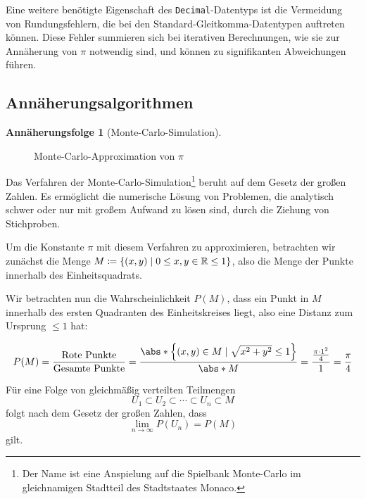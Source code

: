 \documentclass{scrartcl}
\theoremstyle{definition}
\newtheorem{approximation sequence}{Annäherungsfolge}
\DeclarePairedDelimiter{\set}{\lbrace}{\rbrace}
\DeclarePairedDelimiter{\tuple}{\lparen}{\rparen}
\newcommand{\field}[1]{\mathbb{#1}}
\newcommand{\reals}{\field{R}}
\begin{document}
Eine weitere benötigte Eigenschaft des \texttt{Decimal}-Datentyps ist die
Vermeidung von Rundungsfehlern, die bei den Standard-Gleitkomma-Datentypen
auftreten können. Diese Fehler summieren sich bei iterativen Berechnungen, wie
sie zur Annäherung von \(\pi\) notwendig sind, und können zu signifikanten
Abweichungen führen.

\subsection{Annäherungsalgorithmen}

\begin{approximation sequence}[Monte-Carlo-Simulation]~\\[12pt]
\begin{figure}[H]
    \centering
    
    \caption{Monte-Carlo-Approximation von \(\pi\)}
    \label{fig:monte-carlo-approximation}
\end{figure}

Das Verfahren der Monte-Carlo-Simulation\footnote{Der Name ist eine Anspielung
auf die Spielbank Monte-Carlo im gleichnamigen Stadtteil des Stadtstaates
Monaco.\cite{anderson:1986:metropolis}} beruht auf dem Gesetz der großen
Zahlen. Es ermöglicht die numerische Lösung von Problemen, die analytisch
schwer oder nur mit großem Aufwand zu lösen sind, durch die Ziehung von
Stichproben.

Um die Konstante \(\pi\) mit diesem Verfahren zu approximieren, betrachten wir
zunächst die Menge \(M \coloneq \set{\tuple{x, y} \mid 0 \le x,y \in \reals \le
1 }\), also die Menge der Punkte innerhalb des Einheitsquadrats.

Wir betrachten nun die Wahrscheinlichkeit \(P(M)\), dass ein Punkt in \(M\)
innerhalb des ersten Quadranten des Einheitskreises liegt, also eine Distanz
zum Ursprung \(\le 1\) hat:

\begin{equation}
    P(M)
    = \frac{\text{Rote Punkte}}{\text{Gesamte Punkte}}
    = \frac{\abs*{\set*{(x, y) \in M \mid \sqrt{x^2 + y^2} \le 1}}}{\abs*{M}}
    = \frac{\frac{\pi \cdot 1^2}{4}}{1}
    = \frac{\pi}{4}
\end{equation}

Für eine Folge von gleichmäßig verteilten Teilmengen
\begin{equation}
    U_1 \subset U_2 \subset \cdots \subset U_n \subset M
\end{equation}
folgt nach dem Gesetz der großen Zahlen, dass
\begin{equation}
    \lim_{n \to \infty} P(U_n) = P(M)
\end{equation}
gilt.


\end{approximation sequence}
\end{document}

